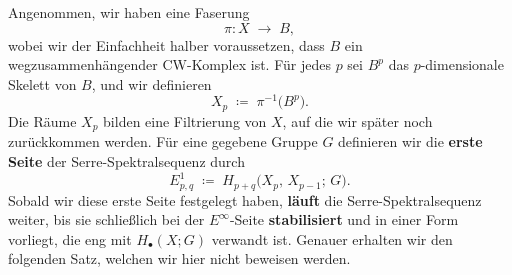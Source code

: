 \documentclass[12pt]{article}
\numberwithin{conj}{section}
\begin{document}
                \noindent
                Angenommen, wir haben eine Faserung 
                \[
                    \pi: X \;\longrightarrow\; B,
                \]
                wobei wir der Einfachheit halber voraussetzen, dass $B$ ein wegzusammenhängender CW-Komplex ist. Für jedes $p$ sei $B^p$ das $p$-dimensionale Skelett von $B$, und wir definieren
                \[
                    X_p \;\coloneqq\; \pi^{-1}\bigl(B^p\bigr).
                \]
                Die Räume $X_p$ bilden eine Filtrierung von $X$, auf die wir später noch zurückkommen werden. Für eine gegebene Gruppe $G$ definieren wir die \textbf{erste Seite} der Serre-Spektralsequenz durch
                \[
                    E^1_{p,q}
                    \;\coloneqq\;
                    H_{p+q}\bigl(X_p,\,X_{p-1};\,G\bigr).
                \]
                Sobald wir diese erste Seite festgelegt haben, \textbf{läuft} die Serre-Spektralsequenz weiter, bis sie schließlich bei der $E^\infty$-Seite \textbf{stabilisiert} und in einer Form vorliegt, die eng mit $H_{\bullet}(X;G)$ verwandt ist. Genauer erhalten wir den folgenden Satz, welchen wir hier nicht beweisen werden.
                
\end{document}
